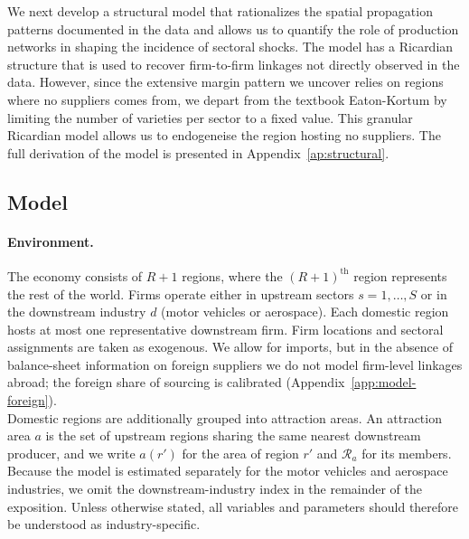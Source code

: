 

We next develop a structural model that rationalizes the spatial propagation patterns documented in the data and allows us to quantify the role of production networks in shaping the incidence of sectoral shocks. The model has a Ricardian structure that is used to recover firm-to-firm linkages not directly observed in the data. However, since the extensive margin pattern we uncover relies on regions where no suppliers comes from, we depart from the textbook Eaton-Kortum by limiting the number of varieties per sector to a fixed value. This granular Ricardian model allows us to endogeneise the region hosting no suppliers. The full derivation of the model is presented in Appendix~\ref{ap:structural}.

\subsection{Model}\label{subsec:model}



\paragraph{Environment.}
The economy consists of $R+1$ regions, where the $(R+1)^{\text{th}}$ region represents the rest of the world.   Firms operate either in upstream sectors $s = 1,\ldots,S$ or in the downstream industry $d$ (motor vehicles or aerospace). Each domestic region hosts at most one representative downstream firm. Firm locations and sectoral assignments are taken as exogenous. We allow for imports, but in the absence of balance-sheet information on foreign suppliers we do not model firm-level linkages abroad; the foreign share of sourcing is calibrated (Appendix~\ref{app:model-foreign}).\\ 

Domestic regions are additionally grouped into attraction areas. An attraction area $a$ is the set of upstream regions sharing the same nearest downstream producer, and we write $a(r')$ for the area of region $r'$ and $\mathcal{R}_{a}$ for its members. Because the model is estimated separately for the motor vehicles and aerospace industries, we omit the downstream-industry index in the remainder of the exposition. Unless otherwise stated, all variables and parameters should therefore be understood as industry-specific.


